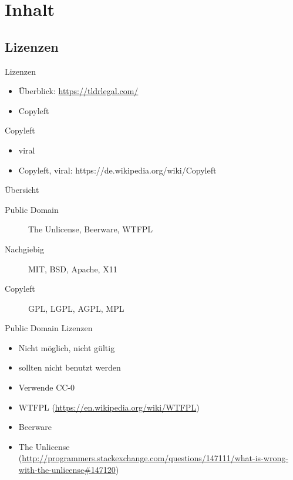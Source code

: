 \section{Inhalt}

\subsection{Lizenzen}
\begin{frame}
  Lizenzen
\end{frame}

\begin{frame}
  \begin{itemize}
    \item Überblick: \url{https://tldrlegal.com/}
    \item Copyleft
  \end{itemize}
\end{frame}

\begin{frame}{Copyleft}
  \begin{itemize}
    \item viral
  \end{itemize}
\end{frame}
\note
{
  \begin{itemize}
    \item Copyleft, viral: https://de.wikipedia.org/wiki/Copyleft
  \end{itemize}
}

\begin{frame}{Übersicht}
  \begin{description}
    \item[Public Domain] The Unlicense, Beerware, WTFPL
    \item[Nachgiebig] MIT, BSD, Apache, X11
    \item[Copyleft] GPL, LGPL, AGPL, MPL
  \end{description}
\end{frame}

\begin{frame}{Public Domain Lizenzen}
  \begin{itemize}
    \item Nicht möglich, nicht gültig
    \item sollten nicht benutzt werden
    \item Verwende CC-0
  \end{itemize}
\end{frame}
\note
{
	\begin{itemize}
		\item WTFPL (\url{https://en.wikipedia.org/wiki/WTFPL})
		\item Beerware
		\item The Unlicense (\url{http://programmers.stackexchange.com/questions/147111/what-is-wrong-with-the-unlicense\#147120})
	\end{itemize}
}

